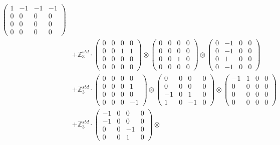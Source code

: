 \documentclass{article}
\begin{document}
{\begin{align}
            \begin{pmatrix} 1 & -1 & -1 & -1 \\ 0 & 0 & 0 & 0 \\ 0 & 0 & 0 & 0 \\ 0 & 0 & 0 & 0 \end{pmatrix} \\ 
        &+ \label{Rs1-Rc16-Solution-3-c7} \mathbb{Z}_3^{std} \cdot 
            \begin{pmatrix} 0 & 0 & 0 & 0 \\ 0 & 0 & 1 & 1 \\ 0 & 0 & 0 & 0 \\ 0 & 0 & 0 & 0 \end{pmatrix} \otimes 
            \begin{pmatrix} 0 & 0 & 0 & 0 \\ 0 & 0 & 0 & 0 \\ 0 & 0 & 1 & 0 \\ 0 & 0 & 0 & 0 \end{pmatrix} \otimes 
            \begin{pmatrix} 0 & -1 & 0 & 0 \\ 0 & -1 & 0 & 0 \\ 0 & 1 & 0 & 0 \\ 0 & -1 & 0 & 0 \end{pmatrix} \\ 
        &+ \label{Rs1-Rc16-Solution-3-c8} \mathbb{Z}_3^{std} \cdot 
            \begin{pmatrix} 0 & 0 & 0 & 0 \\ 0 & 0 & 0 & 1 \\ 0 & 0 & 0 & 0 \\ 0 & 0 & 0 & -1 \end{pmatrix} \otimes 
            \begin{pmatrix} 0 & 0 & 0 & 0 \\ 0 & 0 & 0 & 0 \\ -1 & 0 & 1 & 0 \\ 1 & 0 & -1 & 0 \end{pmatrix} \otimes 
            \begin{pmatrix} -1 & 1 & 0 & 0 \\ 0 & 0 & 0 & 0 \\ 0 & 0 & 0 & 0 \\ 0 & 0 & 0 & 0 \end{pmatrix} \\ 
        &+ \label{Rs1-Rc16-Solution-3-c9} \mathbb{Z}_3^{std} \cdot 
            \begin{pmatrix} -1 & 0 & 0 & 0 \\ -1 & 0 & 0 & 0 \\ 0 & 0 & -1 & 0 \\ 0 & 0 & 1 & 0 \end{pmatrix} \otimes 

\end{align}}
\end{document}
